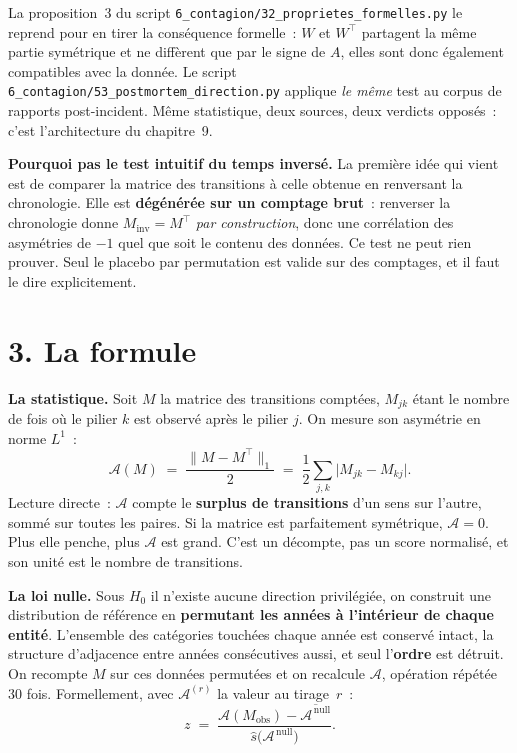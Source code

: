 \documentclass[11pt,a4paper]{article}
\begin{document}
La proposition~3 du script \texttt{6\_contagion\slash 32\_proprietes\_formelles.py} le
reprend pour en tirer la conséquence formelle~: $W$ et $W^{\top}$ partagent la même partie
symétrique et ne diffèrent que par le signe de $A$, elles sont donc également compatibles
avec la donnée. Le script \texttt{6\_contagion\slash 53\_postmortem\_direction.py} applique
\emph{le même} test au corpus de rapports post-incident. Même statistique, deux sources,
deux verdicts opposés~: c'est l'architecture du chapitre~9.

\begin{cle}[colback=orange!8,colframe=orange!70!black]
\textbf{Pourquoi pas le test intuitif du \og temps inversé\fg.} La première idée qui vient
est de comparer la matrice des transitions à celle obtenue en renversant la chronologie.
Elle est \textbf{dégénérée sur un comptage brut}~: renverser la chronologie donne
$M_{\text{inv}}=M^{\top}$ \emph{par construction}, donc une corrélation des asymétries de
$-1$ quel que soit le contenu des données. Ce test ne peut rien prouver. Seul le placebo par
permutation est valide sur des comptages, et il faut le dire explicitement.
\end{cle}

\section*{3. La formule}

\textbf{La statistique.} Soit $M$ la matrice des transitions comptées, $M_{jk}$ étant le
nombre de fois où le pilier $k$ est observé après le pilier $j$. On mesure son asymétrie en
norme $L^1$~:
\begin{equation}
  \mathcal{A}(M)\;=\;\frac{\bigl\|M-M^{\top}\bigr\|_1}{2}
  \;=\;\frac12\sum_{j,k}\bigl|M_{jk}-M_{kj}\bigr| .
  \label{eq:asym}
\end{equation}
Lecture directe~: $\mathcal{A}$ compte le \textbf{surplus de transitions} d'un sens sur
l'autre, sommé sur toutes les paires. Si la matrice est parfaitement symétrique,
$\mathcal{A}=0$. Plus elle penche, plus $\mathcal{A}$ est grand. C'est un décompte, pas un
score normalisé, et son unité est le nombre de transitions.

\textbf{La loi nulle.} Sous $H_0$ \og il n'existe aucune direction privilégiée\fg, on
construit une distribution de référence en \textbf{permutant les années à l'intérieur de
chaque entité}. L'ensemble des catégories touchées chaque année est conservé intact, la
structure d'adjacence entre années consécutives aussi, et seul l'\textbf{ordre} est détruit.
On recompte $M$ sur ces données permutées et on recalcule $\mathcal{A}$, opération répétée
$30$ fois. Formellement, avec $\mathcal{A}^{(r)}$ la valeur au tirage~$r$~:
\begin{equation}
  z\;=\;\frac{\mathcal{A}(M_{\text{obs}})-\overline{\mathcal{A}^{\,\text{null}}}}
       {\widehat{s}\bigl(\mathcal{A}^{\,\text{null}}\bigr)} .
  \label{eq:z}
\end{equation}
\end{document}

